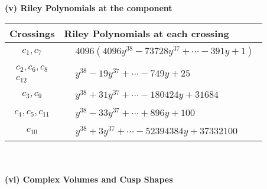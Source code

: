 \documentclass[1p]{elsarticle_modified}
\theoremstyle{definition}
\begin{document}
\newpage\renewcommand{\arraystretch}{1}
\flushleft \textbf{(v) Riley Polynomials at the component}\newline \\
\begin{tabular}{m{50pt}|m{274pt}}
Crossings & \hspace{64pt}Riley Polynomials at each crossing \\
\hline $$\begin{aligned}c_{1},c_{7}\end{aligned}$$&$\begin{aligned}
&4096(4096 y^{38}-73728 y^{37}+\cdots-391 y+1)
\end{aligned}$\\
\hline $$\begin{aligned}c_{2},c_{6},c_{8}\\c_{12}\end{aligned}$$&$\begin{aligned}
&y^{38}-19 y^{37}+\cdots-749 y+25
\end{aligned}$\\
\hline $$\begin{aligned}c_{3},c_{9}\end{aligned}$$&$\begin{aligned}
&y^{38}+31 y^{37}+\cdots-180424 y+31684
\end{aligned}$\\
\hline $$\begin{aligned}c_{4},c_{5},c_{11}\end{aligned}$$&$\begin{aligned}
&y^{38}-33 y^{37}+\cdots+896 y+100
\end{aligned}$\\
\hline $$\begin{aligned}c_{10}\end{aligned}$$&$\begin{aligned}
&y^{38}+3 y^{37}+\cdots-52394384 y+37332100
\end{aligned}$\\
\hline
\end{tabular}\\~\\
\newpage\flushleft \textbf{(vi) Complex Volumes and Cusp Shapes}
\end{document}
